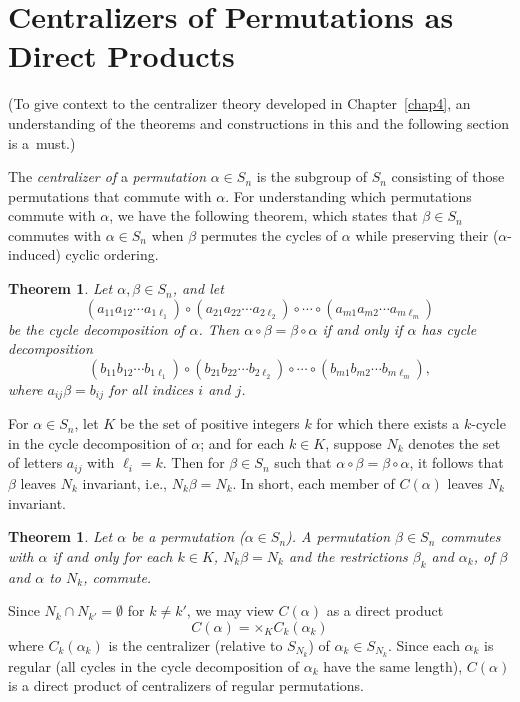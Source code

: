 \documentclass{surv-l}
\numberwithin{equation}{section}
\numberwithin{table}{section}
\numberwithin{figure}{section}
\theoremstyle{plain}
\newtheorem{theorem}[equation]{Theorem}
\theoremstyle{definition}
\begin{document}
\section{Centralizers of Permutations as Direct Products}\label{secA.73}

(To give context to the centralizer theory developed in
Chapter~\ref{chap4}, an understanding of the theorems and
constructions in this and the following section is a~must.)

The \emph{centralizer of} a \emph{permutation} $\alpha\in S_{n}$
is the subgroup of $S_{n}$ consisting of those permutations that
commute with $\alpha$. For understanding which permutations
commute with $\alpha$, we have the following theorem, which states
that $\beta\in S_{n}$ commutes with $\alpha\in S_{n}$ when $\beta$
permutes the cycles of $\alpha$ while preserving their
($\alpha$-induced) cyclic ordering.

\begin{theorem}\label{thmA.73.1}
Let $\alpha,\beta\in S_{n}$, and let
\[
(a_{11}a_{12}\cdots a_{1\ell_{1}})\circ(a_{21}a_{22}\cdots a_{2\ell_{2}})
\circ\cdots \circ (a_{m1}a_{m2}\cdots a_{m\ell_{m}})
\]
be the cycle decomposition of $\alpha$. Then $\alpha
\circ\beta=\beta \circ\alpha$ if and only if $\alpha$ has
cycle decomposition
\[
(b_{11}b_{12}\cdots b_{1\ell_{1}})\circ(b_{21}b_{22}\cdots b_{2\ell_{2}})
\circ\cdots \circ (b_{m1}b_{m2}\cdots b_{m\ell_{m}}),
\]
where $a_{ij}\beta=b_{ij}$ for all indices $i$ and $j$.
\end{theorem}

For $\alpha\in S_{n}$, let $K$ be the set of positive integers $k$
for which there exists a $k$-cycle in the cycle decomposition of
$\alpha$; and for each $k\in K$, suppose $N_{k}$ denotes the set
of letters $a_{ij}$ with $\ell_{i}=k$. Then for $\beta\in S_{n}$
such that $\alpha \circ\beta=\beta \circ\alpha$, it follows that
$\beta$ leaves $N_{k}$ invariant, i.e., $N_{k}\beta=N_{k}$. In
short, each member of $C(\alpha)$ leaves $N_{k}$ invariant.

\begin{theorem}\label{thmA.73.2}
Let $\alpha$ be a permutation ($\alpha\in S_{n}$). A
permutation $\beta\in S_{n}$ commutes with $\alpha$ if and
only for each $k\in K$, $N_{k}\beta=N_{k}$ and the restrictions
$\beta_{k}$ and $\alpha_{k}$, of $\beta$ and $\alpha$ to
$N_{k}$, commute.
\end{theorem}

Since $N_{k}\cap N_{k'}=\emptyset$ for $k\neq k'$, we may
view $C(\alpha)$ as a direct product
\[
C(\alpha)=\times {}_{K}C_{k}(\alpha_{k})
\]
where $C_{k}(\alpha_{k})$ is the centralizer (relative to
$S_{N_{k}}$) of $\alpha_{k}\in S_{N_{k}}$. Since each $\alpha_{k}$
is regular (all cycles in the cycle decomposition of $\alpha_{k}$
have the same length), $C(\alpha)$ is a direct product of
centralizers of regular permutations.
\end{document}
